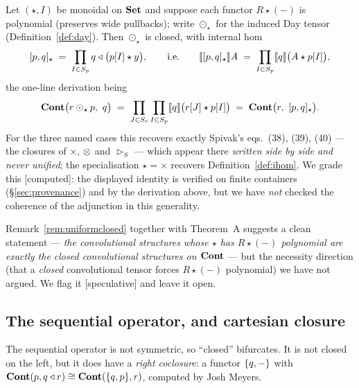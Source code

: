 \begin{Remark}\label{rem:uniformclosed}
Let $(\star,I)$ be monoidal on $\mathbf{Set}$ and suppose each functor $R\star(-)$ is
polynomial (preserves wide pullbacks); write $\odot_\star$ for the induced Day
tensor (Definition~\ref{def:day}). Then $\odot_\star$ is closed, with internal
hom
\[
   [p,q]_\star\;=\;\prod_{I\in S_p} q\mathbin{\triangleleft}\bigl(p[I]\star y\bigr),
   \qquad\text{i.e.}\qquad
   \llbracket [p,q]_\star \rrbracket A\;=\;\prod_{I\in S_p}\llbracket q \rrbracket\bigl(A\star p[I]\bigr),
\]
the one-line derivation being
\[
   \mathbf{Cont}\bigl(r\odot_\star p,\ q\bigr)
   \;=\;\prod_{J\in S_r}\prod_{I\in S_p}\llbracket q \rrbracket\bigl(r[J]\star p[I]\bigr)
   \;=\;\mathbf{Cont}\bigl(r,\ [p,q]_\star\bigr).
\]
For the three named cases this recovers exactly Spivak's
eqs.~(38), (39), (40) \cite{SpivakRef} --- the closures of $\times$, $\mathbin{\otimes}$ and
$\rhd_S$ --- which appear there \emph{written side by side and never unified};
the specialisation $\star=\times$ recovers Definition~\ref{def:ihom}. We grade
this \textsf{[computed]}: the displayed identity is verified on finite containers
(§\ref{sec:provenance}) and by the derivation above, but we have \emph{not}
checked the coherence of the adjunction in this generality.
\end{Remark}

\begin{Remark}\label{rem:speculative}
Remark~\ref{rem:uniformclosed} together with Theorem~A suggests a clean
statement --- \emph{the convolutional structures whose $\star$ has $R\star(-)$
polynomial are exactly the closed convolutional structures on $\mathbf{Cont}$} --- but the
necessity direction (that a \emph{closed} convolutional tensor forces
$R\star(-)$ polynomial) we have not argued. We flag it \textsf{[speculative]} and
leave it open.
\end{Remark}

\subsection{The sequential operator, and cartesian closure}

The sequential operator is not symmetric, so ``closed'' bifurcates. It is not
closed on the left, but it does have a \emph{right coclosure}: a functor
$\{q,-\}$ with $\mathbf{Cont}(p, q\mathbin{\triangleleft} r)\cong\mathbf{Cont}(\{q,p\}, r)$, computed by
Josh Meyers.


